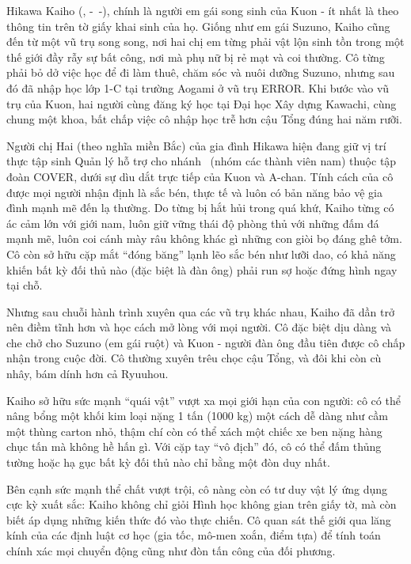 \documentclass[../main.tex]{subfiles}
\begin{document}
\chrint

Hikawa Kaiho (, -\ -), chính là người em gái song sinh của Kuon - ít nhất là theo thông tin trên tờ giấy khai sinh của họ. Giống như em gái Suzuno, Kaiho cũng đến từ một vũ trụ song song, nơi hai chị em từng phải vật lộn sinh tồn trong một thế giới đầy rẫy sự bất công, nơi mà phụ nữ bị rẻ mạt và coi thường. Cô từng phải bỏ dở việc học để đi làm thuê, chăm sóc và nuôi dưỡng Suzuno, nhưng sau đó đã nhập học lớp 1-C tại trường Aogami ở vũ trụ ERROR. Khi bước vào vũ trụ của Kuon, hai người cùng đăng ký học tại Đại học Xây dựng Kawachi, cùng chung một khoa, bất chấp việc cô nhập học trễ hơn cậu Tổng đúng hai năm rưỡi.


Người chị Hai (theo nghĩa miền Bắc) của gia đình Hikawa hiện đang giữ vị trí thực tập sinh Quản lý hỗ trợ cho nhánh \hls\ (nhóm các thành viên nam) thuộc tập đoàn COVER, dưới sự dìu dắt trực tiếp của Kuon và A-chan. Tính cách của cô được mọi người nhận định là sắc bén, thực tế và luôn có bản năng bảo vệ gia đình mạnh mẽ đến lạ thường. Do từng bị hắt hủi trong quá khứ, Kaiho từng có ác cảm lớn với giới nam, luôn giữ vững thái độ phòng thủ với những đấm đá mạnh mẽ, luôn coi cánh mày râu không khác gì những con giòi bọ đáng ghê tởm. Cô còn sở hữu cặp mắt ``đóng băng'' lạnh lẽo sắc bén như lưỡi dao, có khả năng khiến bất kỳ đối thủ nào (đặc biệt là đàn ông) phải run sợ hoặc đứng hình ngay tại chỗ.

Nhưng sau chuỗi hành trình xuyên qua các vũ trụ khác nhau, Kaiho đã dần trở nên điềm tĩnh hơn và học cách mở lòng với mọi người. Cô đặc biệt dịu dàng và che chở cho Suzuno (em gái ruột) và Kuon - người đàn ông đầu tiên được cô chấp nhận trong cuộc đời. Cô thường xuyên trêu chọc cậu Tổng, và đôi khi còn cù nhây, bám dính hơn cả Ryuuhou.

Kaiho sở hữu sức mạnh ``quái vật'' vượt xa mọi giới hạn của con người: cô có thể nâng bổng một khối kim loại nặng 1 tấn (1000 kg) một cách dễ dàng như cầm một thùng carton nhỏ, thậm chí còn có thể xách một chiếc xe ben nặng hàng chục tấn mà không hề hấn gì. Với cặp tay ``vô địch'' đó, cô có thể đấm thủng tường hoặc hạ gục bất kỳ đối thủ nào chỉ bằng một đòn duy nhất.

Bên cạnh sức mạnh thể chất vượt trội, cô nàng còn có tư duy vật lý ứng dụng cực kỳ xuất sắc: Kaiho không chỉ giỏi Hình học không gian trên giấy tờ, mà còn biết áp dụng những kiến thức đó vào thực chiến. Cô quan sát thế giới qua lăng kính của các định luật cơ học (gia tốc, mô-men xoắn, điểm tựa) để tính toán chính xác mọi chuyển động cũng như đòn tấn công của đối phương.
\end{document}
